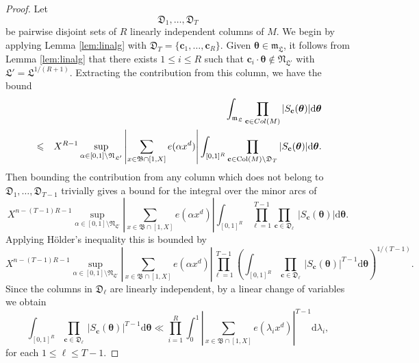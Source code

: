 \documentclass[reqno, 12pt, reqno]{amsart}
\numberwithin{equation}{section}
\renewcommand{\leq}{\leqslant}
\renewcommand{\c}{\mathbf{c}}
\newcommand{\btheta}{\boldsymbol{\theta}}
\renewcommand{\=}{\equiv}
\begin{document}
\begin{proof}
Let
$$
\mathfrak{D}_1, \ldots, \mathfrak{D}_{ T }
$$
be pairwise disjoint sets of $R$ linearly independent columns of $M$.
We begin by applying Lemma \ref{lem:linalg} with $\mathfrak{D}_{T } = \{ \c_1, \ldots, \c_{R} \}$.
Given $\btheta \in \mathfrak{m}_\mathfrak{L}$, it follows from Lemma \ref{lem:linalg} that there exists $1 \leq i \leq R$ such that $\mathbf c_i \cdot \btheta \not \in \mathfrak{N}_\mathfrak{L'}$ with $\mathfrak{L'} = \mathfrak{L}^{1/(R+1)}$. Extracting the contribution from this column, we have the bound
\begin{eqnarray}
\notag
&& \int_{ \mathfrak{m}_\mathfrak{L} } \prod_{\c \in \textnormal{Col}(M)  } |S_{\c}(\btheta)| \mathrm{d}\btheta
\\
\notag
&\leq& X^{R-1}  \sup_{\alpha \in [0,1] \setminus  \mathfrak{N}_{\mathfrak{L}'}}  \left|  \sum_{x \in \mathfrak{B} \cap [1,X]} e (\alpha x^d) \right|
\int_{[0,1]^R} \prod_{\substack{ \mathbf c \in \text{Col}(M)  \setminus  \mathfrak{D}_{ T  } }} |S_\mathbf{c}(\btheta)|  \mathrm{d}\btheta.
\end{eqnarray}
Then bounding the contribution from any column which does not belong to $\mathfrak{D}_1, \ldots, \mathfrak{D}_{ T - 1  }$ trivially gives a bound for the integral over the minor arcs of
\[
X^{n- (T - 1) R - 1}
\sup_{\alpha \in [0,1] \setminus  \mathfrak{N}_{\mathfrak{L}'}}  \left|  \sum_{x \in \mathfrak{B} \cap [1,X]} e (\alpha x^d) \right|
\int_{[0,1]^R} \prod_{\ell =1}^{T - 1} \prod_{ \mathbf c \in \mathfrak D_\ell} \
\left \vert S_\mathbf{c}(\btheta) \right \vert \mathrm{d}\btheta.
\]
Applying H{\"o}lder's inequality this is bounded by
\[
X^{n- (T - 1) R - 1}
\sup_{\alpha \in [0,1] \setminus  \mathfrak{N}_{\mathfrak{L}'}  }  \left|  \sum_{x \in \mathfrak{B} \cap [1,X]} e (\alpha x^d) \right|
\prod_{\ell =1}^{T-1} \left(
\int_{[0,1]^R}  \prod_{ \mathbf c \in \mathfrak D_\ell} \
\left \vert S_\mathbf{c}(\btheta) \right \vert^{T-1} \mathrm{d}\btheta \right)^{1/(T - 1)} .
\]
Since the columns in $\mathfrak D_\ell$ are linearly independent, by  a linear change of variables  we obtain   %
\[
\int_{[0,1]^R}  \prod_{ \mathbf c \in \mathfrak D_\ell} \
\left \vert S_\mathbf{c}(\btheta) \right \vert^{T-1} \mathrm{d}\btheta  \ll   \prod_{i=1}^R \int_0^1  \left|  \sum_{x \in \mathfrak{B} \cap [1,X]} e (\lambda_i x^d) \right|^{T-1} \mathrm{d} \lambda_i,
\]
for each $1 \leq \ell \leq T-1$.

\end{proof}
\end{document}
